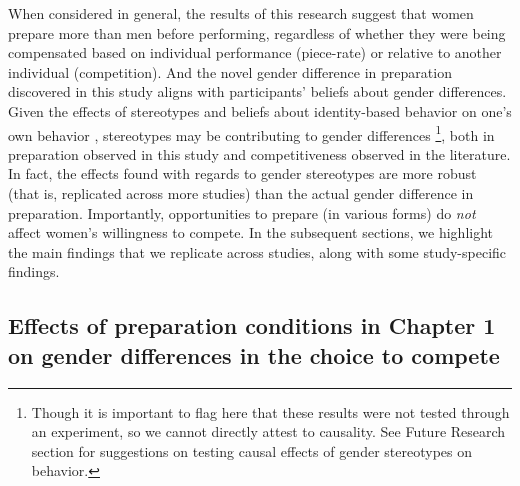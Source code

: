 \documentclass[a4paper, nobind]{templates/ociamthesis}
\begin{document}
When considered in general, the results of this research suggest that women prepare more than men before performing, regardless of whether they were being compensated based on individual performance (piece-rate) or relative to another individual (competition). And the novel gender difference in preparation discovered in this study aligns with participants' beliefs about gender differences. Given the effects of stereotypes and beliefs about identity-based behavior on one's own behavior \autocite{Bordalo2019,Miller2016,Ellemers2018,Akerlof2000,Benjamin2010c}, stereotypes may be contributing to gender differences \footnote{Though it is important to flag here that these results were not tested through an experiment, so we cannot directly attest to causality. See Future Research section for suggestions on testing causal effects of gender stereotypes on behavior.}, both in preparation observed in this study and competitiveness observed in the literature. In fact, the effects found with regards to gender stereotypes are more robust (that is, replicated across more studies) than the actual gender difference in preparation. Importantly, opportunities to prepare (in various forms) do \emph{not} affect women's willingness to compete. In the subsequent sections, we highlight the main findings that we replicate across studies, along with some study-specific findings.

\hypertarget{effects-of-preparation-conditions-in-chapter-1-on-gender-differences-in-the-choice-to-compete}{%
\subsection{Effects of preparation conditions in Chapter 1 on gender differences in the choice to compete}\label{effects-of-preparation-conditions-in-chapter-1-on-gender-differences-in-the-choice-to-compete}}
\end{document}
